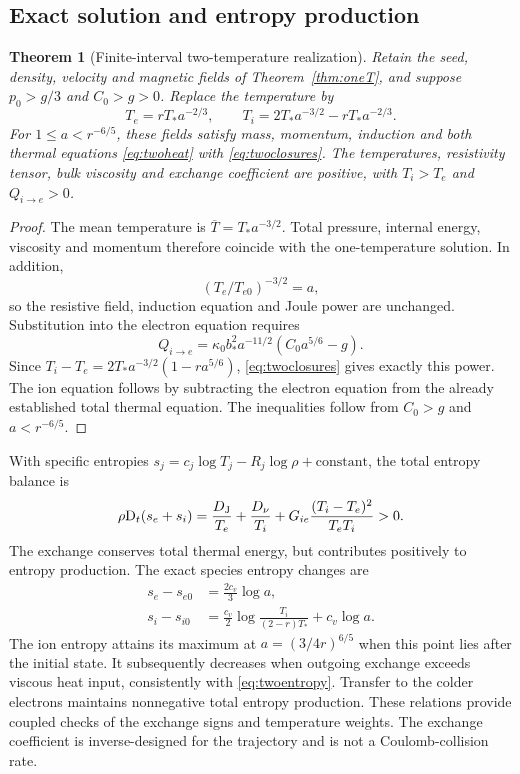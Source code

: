\documentclass[11pt,a4paper]{article}
\newtheorem{theorem}{Theorem}
\theoremstyle{remark}\newtheorem{remark}{Remark}
\numberwithin{equation}{section}
\newcommand{\Dt}{\mathrm D_t}
\begin{document}
\subsection{Exact solution and entropy production}
\begin{theorem}[Finite-interval two-temperature realization]\label{thm:twoT}
Retain the seed, density, velocity and magnetic fields of Theorem~\ref{thm:oneT}, and suppose $p_0>g/3$ and $C_0>g>0$. Replace the temperature by
\begin{equation}
T_e=rT_*a^{-2/3},\qquad
T_i=2T_*a^{-3/2}-rT_*a^{-2/3}.
\label{eq:twotemperatures}
\end{equation}
For $1\le a<r^{-6/5}$, these fields satisfy mass, momentum, induction and both thermal equations \eqref{eq:twoheat} with \eqref{eq:twoclosures}. The temperatures, resistivity tensor, bulk viscosity and exchange coefficient are positive, with $T_i>T_e$ and $Q_{i\to e}>0$.
\end{theorem}
\begin{proof}
The mean temperature is $\overline T=T_*a^{-3/2}$. Total pressure, internal energy, viscosity and momentum therefore coincide with the one-temperature solution. In addition,
\[
(T_e/T_{e0})^{-3/2}=a,
\]
so the resistive field, induction equation and Joule power are unchanged. Substitution into the electron equation requires
\begin{equation}
Q_{i\to e}=\kappa_0b_*^2a^{-11/2}(C_0a^{5/6}-g).
\label{eq:exchangepower}
\end{equation}
Since $T_i-T_e=2T_*a^{-3/2}(1-ra^{5/6})$, \eqref{eq:twoclosures} gives exactly this power. The ion equation follows by subtracting the electron equation from the already established total thermal equation. The inequalities follow from $C_0>g$ and $a<r^{-6/5}$.
\end{proof}

With specific entropies $s_j=c_j\log T_j-R_j\log\rho+\text{constant}$, the total entropy balance is
\begin{equation}
\rho\Dt(s_e+s_i)
=\frac{D_{\rm J}}{T_e}+\frac{D_\nu}{T_i}
+G_{ie}\frac{(T_i-T_e)^2}{T_eT_i}>0.
\label{eq:twoentropy}
\end{equation}
The exchange conserves total thermal energy, but contributes positively to entropy production. The exact species entropy changes are
\begin{equation}
\begin{aligned}
s_e-s_{e0}&=\frac{2c_v}{3}\log a,\\
s_i-s_{i0}&=\frac{c_v}{2}\log\frac{T_i}{(2-r)T_*}+c_v\log a.
\end{aligned}
\label{eq:speciesentropy}
\end{equation}
The ion entropy attains its maximum at $a=(3/4r)^{6/5}$ when this point lies after the initial state. It subsequently decreases when outgoing exchange exceeds viscous heat input, consistently with \eqref{eq:twoentropy}. Transfer to the colder electrons maintains nonnegative total entropy production. These relations provide coupled checks of the exchange signs and temperature weights. The exchange coefficient is inverse-designed for the trajectory and is not a Coulomb-collision rate.
\end{document}
